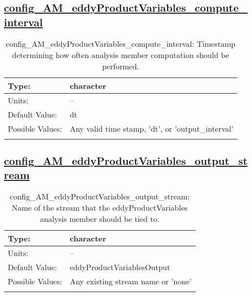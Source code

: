 \subsection[config\_AM\_eddyProductVariables\_compute\_interval]{\hyperref[sec:nm_tab_AM_eddyProductVariables]{config\_AM\_eddyProductVariables\_compute\_interval}}
\label{subsec:nm_sec_config_AM_eddyProductVariables_compute_interval}
\begin{center}
\begin{longtable}{| p{2.0in} || p{4.0in} |}
    \hline
    Type: & character \\
    \hline
    Units: & -- \\
    \hline
    Default Value: & dt \\
    \hline
    Possible Values: & Any valid time stamp, 'dt', or 'output\_interval' \\
    \hline
    \caption{config\_AM\_eddyProductVariables\_compute\_interval: Timestamp determining how often analysis member computation should be performed.}
\end{longtable}
\end{center}
\subsection[config\_AM\_eddyProductVariables\_output\_stream]{\hyperref[sec:nm_tab_AM_eddyProductVariables]{config\_AM\_eddyProductVariables\_output\_stream}}
\label{subsec:nm_sec_config_AM_eddyProductVariables_output_stream}
\begin{center}
\begin{longtable}{| p{2.0in} || p{4.0in} |}
    \hline
    Type: & character \\
    \hline
    Units: & -- \\
    \hline
    Default Value: & eddyProductVariablesOutput \\
    \hline
    Possible Values: & Any existing stream name or 'none' \\
    \hline
    \caption{config\_AM\_eddyProductVariables\_output\_stream: Name of the stream that the eddyProductVariables analysis member should be tied to.}
\end{longtable}
\end{center}
